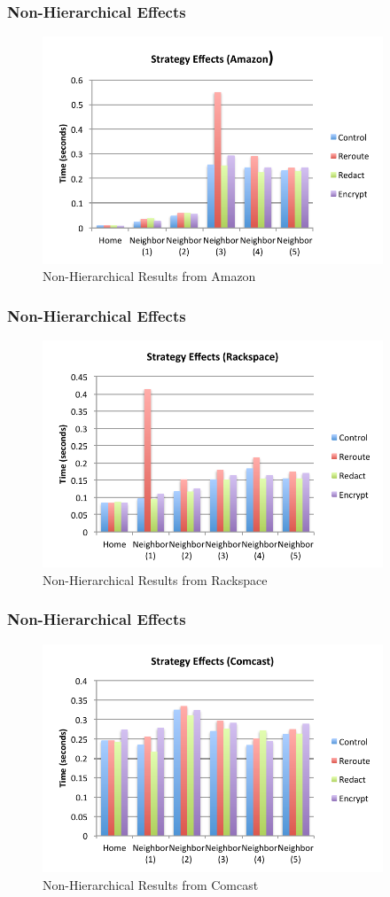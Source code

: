 \documentclass[t,handout]{beamer}
\begin{document}
\begin{frame}
\frametitle{Non-Hierarchical Effects}
\begin{figure}[!t]
\centering
\includegraphics[width=4in]{nh_strategy_effects_az}
\caption{Non-Hierarchical Results from Amazon}
\end{figure}
\end{frame}

\begin{frame}
\frametitle{Non-Hierarchical Effects}
\begin{figure}[!t]
\centering
\includegraphics[width=4in]{nh_strategy_effects_rs}
\caption{Non-Hierarchical  Results from Rackspace}
\end{figure}
\end{frame}

\begin{frame}
\frametitle{Non-Hierarchical Effects}
\begin{figure}[!t]
\centering
\includegraphics[width=4in]{nh_strategy_effects_local}
\caption{Non-Hierarchical Results from Comcast}
\end{figure}
\end{frame}
\end{document}
